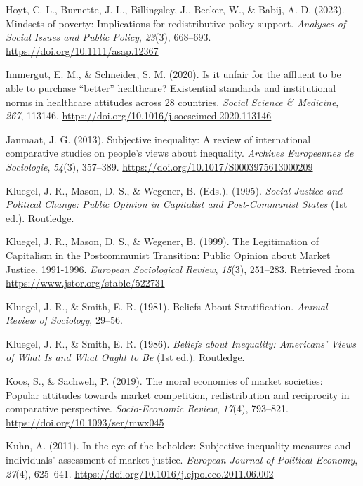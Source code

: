 \documentclass[
  12pt,
]{article}
\newlength{\cslhangindent}
\newenvironment{CSLReferences}[2] %
 {\begin{list}{}{%
  \setlength{\itemindent}{0pt}
  \setlength{\leftmargin}{0pt}
  \setlength{\parsep}{0pt}
  \ifodd #1
   \setlength{\leftmargin}{\cslhangindent}
   \setlength{\itemindent}{-1\cslhangindent}
  \fi
  \setlength{\itemsep}{#2\baselineskip}}}
 {\end{list}}
\begin{document}
\begin{CSLReferences}{1}{0}
Hoyt, C. L., Burnette, J. L., Billingsley, J., Becker, W., \& Babij, A.
D. (2023). Mindsets of poverty: {Implications} for redistributive policy
support. \emph{Analyses of Social Issues and Public Policy},
\emph{23}(3), 668--693. \url{https://doi.org/10.1111/asap.12367}

Immergut, E. M., \& Schneider, S. M. (2020). Is it unfair for the
affluent to be able to purchase {``better''} healthcare? {Existential}
standards and institutional norms in healthcare attitudes across 28
countries. \emph{Social Science \& Medicine}, \emph{267}, 113146.
\url{https://doi.org/10.1016/j.socscimed.2020.113146}

Janmaat, J. G. (2013). Subjective inequality: {A} review of
international comparative studies on people's views about inequality.
\emph{Archives Europeennes de Sociologie}, \emph{54}(3), 357--389.
\url{https://doi.org/10.1017/S0003975613000209}

Kluegel, J. R., Mason, D. S., \& Wegener, B. (Eds.). (1995).
\emph{Social {Justice} and {Political Change}: {Public Opinion} in
{Capitalist} and {Post-Communist States}} (1st ed.). Routledge.

Kluegel, J. R., Mason, D. S., \& Wegener, B. (1999). The {Legitimation}
of {Capitalism} in the {Postcommunist Transition}: {Public Opinion}
about {Market Justice}, 1991-1996. \emph{European Sociological Review},
\emph{15}(3), 251--283. Retrieved from
\url{https://www.jstor.org/stable/522731}

Kluegel, J. R., \& Smith, E. R. (1981). Beliefs {About Stratification}.
\emph{Annual Review of Sociology}, 29--56.

Kluegel, J. R., \& Smith, E. R. (1986). \emph{Beliefs about
{Inequality}: {Americans}' {Views} of {What Is} and {What Ought} to
{Be}} (1st ed.). Routledge.

Koos, S., \& Sachweh, P. (2019). The moral economies of market
societies: Popular attitudes towards market competition, redistribution
and reciprocity in comparative perspective. \emph{Socio-Economic
Review}, \emph{17}(4), 793--821.
\url{https://doi.org/10.1093/ser/mwx045}

Kuhn, A. (2011). In the eye of the beholder: {Subjective} inequality
measures and individuals' assessment of market justice. \emph{European
Journal of Political Economy}, \emph{27}(4), 625--641.
\url{https://doi.org/10.1016/j.ejpoleco.2011.06.002}


\end{CSLReferences}
\end{document}
